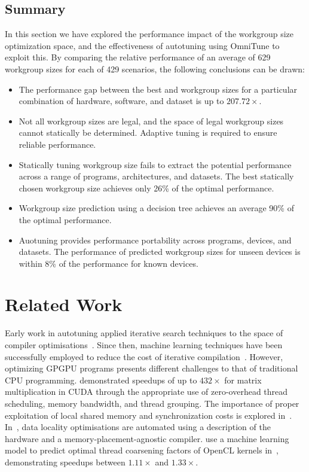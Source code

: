 \documentclass[nonatbib,preprint,nocopyrightspace,9pt]{sigplanconf}
\begin{document}
\subsection{Summary}

In this section we have explored the performance impact of the
workgroup size optimization space, and the effectiveness of autotuning
using OmniTune to exploit this. By comparing the relative performance
of an average of 629 workgroup sizes for each of 429 scenarios, the
following conclusions can be drawn:

%
\begin{itemize}
\item The performance gap between the best and workgroup sizes for a
  particular combination of hardware, software, and dataset is up to
  $207.72\times$.
\item Not all workgroup sizes are legal, and the space of legal
  workgroup sizes cannot statically be determined. Adaptive tuning is
  required to ensure reliable performance.
\item Statically tuning workgroup size fails to extract the potential
  performance across a range of programs, architectures, and
  datasets. The best statically chosen workgroup size achieves only
  26\% of the optimal performance.
\item Workgroup size prediction using a decision tree achieves an
  average 90\% of the optimal performance.
\item Auotuning provides performance portability across programs,
  devices, and datasets. The performance of predicted workgroup sizes
  for unseen devices is within 8\% of the performance for known
  devices.
\end{itemize}


\section{Related Work}\label{sec:related}

Early work in autotuning applied iterative search techniques to the
space of compiler optimisations~\cite{Bodin1998,Kisuki}. Since then,
machine learning techniques have been successfully employed to reduce
the cost of iterative
compilation~\cite{Agakov,Stephenson2003,Fursin2011}. However,
optimizing GPGPU programs presents different challenges to that of
traditional CPU programming. \citeauthor{Ryoo2008a} demonstrated
speedups of up to $432\times$ for matrix multiplication in CUDA
through the appropriate use of zero-overhead thread scheduling, memory
bandwidth, and thread grouping. The importance of proper exploitation
of local shared memory and synchronization costs is explored
in~\cite{Lee2010}. In~\cite{Chen2014}, data locality optimisations are
automated using a description of the hardware and a
memory-placement-agnostic compiler. \citeauthor{Magni2014} use a
machine learning model to predict optimal thread coarsening factors of
OpenCL kernels in~\cite{Magni2014}, demonstrating speedups between
$1.11\times$ and $1.33\times$.
\end{document}

